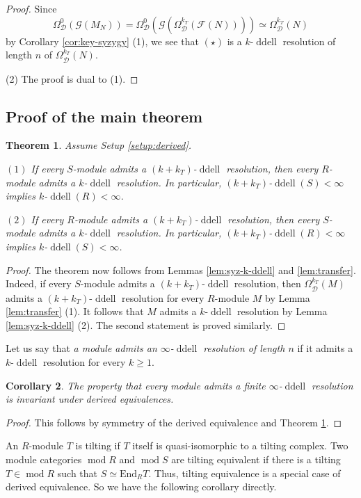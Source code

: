 \documentclass[12pt,a4paper,reqno]{amsart}
\theoremstyle{plain}
\newtheorem{theorem}{Theorem}[section]
\newtheorem{corollary}[theorem]{Corollary}
\theoremstyle{definition}
\theoremstyle{remark}
\DeclareMathOperator{\modd}{mod}
\DeclareMathOperator{\ddell}{ddell}
\newcommand{\syz}{\Omega_{\mathcal{D}}}
\begin{document}
\begin{proof}
Since
\[
\syz^{0}(\mathcal{G}(M_N))
= \syz^{0}(\mathcal{G}(\syz^{k_T}(\mathcal{F}(N))))
\simeq \syz^{k_T}(N)
\] 
by Corollary \ref{cor:key-syzygy} (1), we see that \((\star)\) is a $k$-$\ddell$ resolution of length $n$ of $\syz^{k_T}(N)$.

(2) The proof is dual to (1).
\end{proof}

\subsection{Proof of the main theorem}

\begin{theorem} \label{thm:main}
Assume Setup \ref{setup:derived}. 

$(1)$ If every $S$-module admits a $(k+k_T)$-$\ddell$ resolution, then every $R$-module admits a $k$-$\ddell$ resolution. In particular, $(k+k_T)$-$\ddell (S)<\infty$ implies $k$-$\ddell (R)<\infty$.

$(2)$ If every $R$-module admits a $(k+k_T)$-$\ddell$ resolution, then every $S$-module admits a $k$-$\ddell$ resolution. In particular, $(k+k_T)$-$\ddell (R)<\infty$ implies $k$-$\ddell (S)<\infty$.
\end{theorem}

\begin{proof}
The theorem now follows from Lemmas \ref{lem:syz-k-ddell} and \ref{lem:transfer}. Indeed, if every $S$-module admits a $(k+k_T)$-$\ddell$ resolution, then $\syz^{k_T}(M)$ admits a $(k+k_T)$-$\ddell$ resolution for every $R$-module $M$ by Lemma \ref{lem:transfer} (1). It follows that $M$ admits a $k$-$\ddell$ resolution by Lemma \ref{lem:syz-k-ddell} (2). The second statement is proved similarly.
\end{proof}

Let us say that \emph{a module admits an $\infty$-$\ddell$ resolution of length $n$} if it admits a $k$-$\ddell$ resolution for every $k\ge 1$.

\begin{corollary}\label{cor:derived-invariance}
The property that every module admits a finite $\infty$-$\ddell$ resolution is invariant under derived equivalences. 
\end{corollary}

\begin{proof}
This follows by symmetry of the derived equivalence and Theorem \ref{thm:main}.
\end{proof}

An $R$-module $T$ is tilting if $T$ itself is quasi-isomorphic to a tilting complex. Two module categories $\modd R$ and $\modd S$ are tilting equivalent if there is a tilting $T\in\modd R$ such that $S\simeq \mathrm{End}_RT$. Thus, tilting equivalence is a special case of derived equivalence. So we have the following corollary directly.
\end{document}
